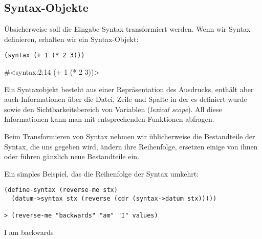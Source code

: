 
\subsection{Syntax-Objekte}
Übsicherweise soll die Eingabe-Syntax transformiert werden. Wenn wir Syntax definieren, erhalten wir ein Syntax-Objekt:

\begin{lstlisting}
(syntax (+ 1 (* 2 3)))
\end{lstlisting}
{\routput\#<syntax:2:14 (+ 1 (* 2 3))>}

Ein Syntaxobjekt besteht aus einer Repräsentation des Ausdrucks, enthält aber auch Informationen über die Datei, Zeile und Spalte in der es definiert wurde sowie den Sichtbarkeitsbereich von Variablen (\emph{lexical scope}). All diese Informationen kann man mit entsprechenden Funktionen abfragen.%
% 
% 
% 
% 
% 
% 

Beim Transformieren von Syntax nehmen wir üblicherweise die Bestandteile der Syntax, die uns gegeben wird, ändern ihre Reihenfolge, ersetzen einige von ihnen oder führen gänzlich neue Bestandteile ein.

Ein simples Beispiel, das die Reihenfolge der Syntax umkehrt:

\begin{lstlisting}
(define-syntax (reverse-me stx)
  (datum->syntax stx (reverse (cdr (syntax->datum stx)))))
  
> (reverse-me "backwards" "am" "I" values)
\end{lstlisting}
{\routput {\qq}I{\qq} {\qq}am{\qq} {\qq}backwards{\qq}}


